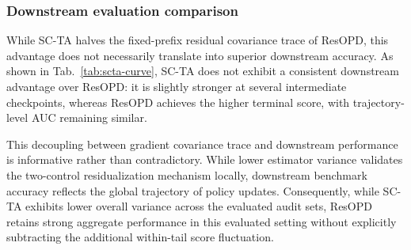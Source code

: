 \subsubsection{Downstream evaluation comparison}
While SC-TA halves the fixed-prefix residual covariance trace of ResOPD, this advantage does not necessarily translate into superior downstream accuracy. As shown in Tab.~\ref{tab:scta-curve},
SC-TA does not exhibit a consistent downstream advantage over ResOPD: it is slightly stronger at several intermediate checkpoints, whereas ResOPD achieves the higher terminal score, with trajectory-level AUC remaining similar.

This decoupling between gradient covariance trace and downstream performance is informative rather than contradictory. While lower estimator variance validates the two-control residualization mechanism locally, downstream benchmark accuracy reflects the global trajectory of policy updates.
Consequently, while SC-TA exhibits lower overall variance across the evaluated audit sets, ResOPD retains strong aggregate performance in this evaluated setting without explicitly subtracting the additional within-tail score fluctuation.
\vspace{-4mm}
